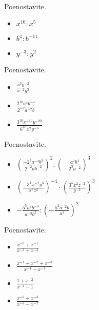     ~\\
            \begin{naloga}
                Poenostavite.
                \begin{itemize}
                    \item $x^{10}:x^5$ 
                    \item $b^4:b^{-11}$ 
                    \item $y^{-3}:y^2$ 
                \end{itemize}
            \end{naloga}

            \begin{naloga}
                Poenostavite.
                \begin{itemize}
                    \item $\frac{x^3y^{-2}}{x^{-2}y^3}$ 
                    \item $\frac{2^{10}a^4b^{-4}}{2^{-2}a^{-2}b}$ 
                    \item $\frac{3^{10}x^{-12}y^{-20}}{6^{10}x^2y^{-3}}$ 
                \end{itemize}
            \end{naloga}


            \begin{naloga}
                Poenostavite.
                \begin{itemize}
                    \item $\left(\frac{-2^5a^{-4}b^3}{2^{-2}ab^{-2}}\right)^2:\left(-\frac{a^2b^4}{2^3a^{-2}}\right)^3$ 
                    \item $\left(\frac{-3^4x^{-2}y^3}{x^3z^2}\right)^{-4}\cdot\left(\frac{3^5x^2z^{-2}}{y^{-3}}\right)^3$ 
                    \item $-\frac{5^5a^4b^{-3}}{a^{-3}b^2}:\left(-\frac{5^2a^{-2}b}{a^2}\right)^2$ 
                \end{itemize}
            \end{naloga}


            \begin{naloga}
                Poenostavite.
                \begin{itemize}
                    \item $\frac{x^{-2}+x^{-1}}{x^{-3}+x^{-2}}$ 
                    \item $\frac{x^{-1}+x^{-2}+x^{-3}}{x^{-4}-x^{-1}}$ 
                    \item $\frac{1+x^{-2}}{x^{-4}-1}$ 
                    \item $\frac{x^{-2}+x^{-3}}{x^{-3}-x^{-2}}$ 
                \end{itemize}
            \end{naloga}


